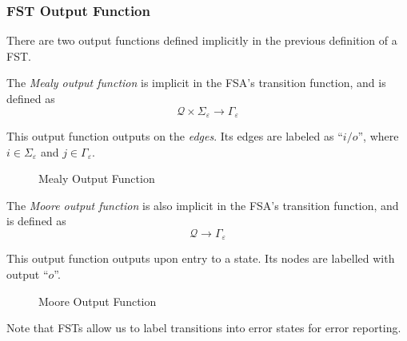 \subsubsection{FST Output Function}

There are two output functions defined implicitly in the previous definition of a FST.

\begin{definition}
    The \textit{Mealy output function} is implicit in the FSA's transition function, and is defined as
    \begin{equation}
        \mathcal{Q} \times \Sigma_{\varepsilon} \to \Gamma_{\varepsilon}
    \end{equation}
    
    This output function outputs on the \textit{edges}. Its edges are labeled as \enquote{$i/o$}, where $i \in \Sigma_{\varepsilon}$ and $j \in \Gamma_{\varepsilon}$.
    
    \begin{figure}[H]
        \centering
        \caption{Mealy Output Function}
        \label{fig:fst-mealy}
    \end{figure}
\end{definition}

\begin{definition}
    The \textit{Moore output function} is also implicit in the FSA's transition function, and is defined as
    \begin{equation}
        \mathcal{Q} \to \Gamma_{\varepsilon}
    \end{equation}
    
    This output function outputs upon entry to a state. Its nodes are labelled with output \enquote{$o$}.
    
    \begin{figure}[H]
        \centering
        \caption{Moore Output Function}
        \label{fig:fst-moore}
    \end{figure}
\end{definition}

\begin{remark}
    Note that FSTs allow us to label transitions into error states for error reporting.
\end{remark}
